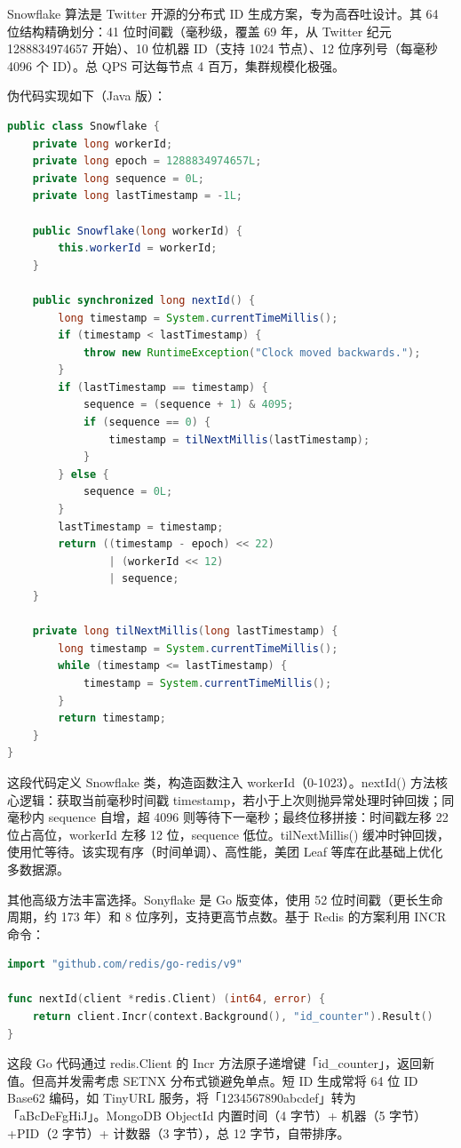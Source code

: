 Snowflake 算法是 Twitter 开源的分布式 ID 生成方案，专为高吞吐设计。其 64 位结构精确划分：41 位时间戳（毫秒级，覆盖 69 年，从 Twitter 纪元 1288834974657 开始）、10 位机器 ID（支持 1024 节点）、12 位序列号（每毫秒 4096 个 ID）。总 QPS 可达每节点 4 百万，集群规模化极强。\par
伪代码实现如下（Java 版）：\par
\begin{lstlisting}[language=java]
public class Snowflake {
    private long workerId;
    private long epoch = 1288834974657L;
    private long sequence = 0L;
    private long lastTimestamp = -1L;

    public Snowflake(long workerId) {
        this.workerId = workerId;
    }

    public synchronized long nextId() {
        long timestamp = System.currentTimeMillis();
        if (timestamp < lastTimestamp) {
            throw new RuntimeException("Clock moved backwards.");
        }
        if (lastTimestamp == timestamp) {
            sequence = (sequence + 1) & 4095;
            if (sequence == 0) {
                timestamp = tilNextMillis(lastTimestamp);
            }
        } else {
            sequence = 0L;
        }
        lastTimestamp = timestamp;
        return ((timestamp - epoch) << 22)
                | (workerId << 12)
                | sequence;
    }

    private long tilNextMillis(long lastTimestamp) {
        long timestamp = System.currentTimeMillis();
        while (timestamp <= lastTimestamp) {
            timestamp = System.currentTimeMillis();
        }
        return timestamp;
    }
}
\end{lstlisting}
这段代码定义 Snowflake 类，构造函数注入 workerId（0-1023）。nextId() 方法核心逻辑：获取当前毫秒时间戳 timestamp，若小于上次则抛异常处理时钟回拨；同毫秒内 sequence 自增，超 4096 则等待下一毫秒；最终位移拼接：时间戳左移 22 位占高位，workerId 左移 12 位，sequence 低位。tilNextMillis() 缓冲时钟回拨，使用忙等待。该实现有序（时间单调）、高性能，美团 Leaf 等库在此基础上优化多数据源。\par
其他高级方法丰富选择。Sonyflake 是 Go 版变体，使用 52 位时间戳（更长生命周期，约 173 年）和 8 位序列，支持更高节点数。基于 Redis 的方案利用 INCR 命令：\par
\begin{lstlisting}[language=go]
import "github.com/redis/go-redis/v9"

func nextId(client *redis.Client) (int64, error) {
    return client.Incr(context.Background(), "id_counter").Result()
}
\end{lstlisting}
这段 Go 代码通过 redis.Client 的 Incr 方法原子递增键「id\_{}counter」，返回新值。但高并发需考虑 SETNX 分布式锁避免单点。短 ID 生成常将 64 位 ID Base62 编码，如 TinyURL 服务，将「1234567890abcdef」转为「aBcDeFgHiJ」。MongoDB ObjectId 内置时间（4 字节）+ 机器（5 字节）+PID（2 字节）+ 计数器（3 字节），总 12 字节，自带排序。\par
